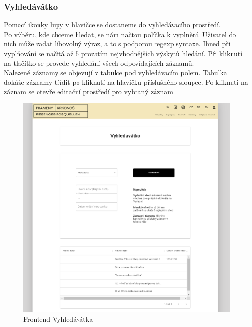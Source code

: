 \subsubsection{Vyhledávátko}
Pomocí ikonky lupy v hlavičce se dostaneme do vyhledávacího prostředí.\\
Po výběru, kde chceme hledat, se nám načtou políčka k vyplnění. Uživatel do nich může zadat
libovolný výraz, a to s podporou regexp syntaxe. Ihned při vyplňování se načítá až 5
prozatím nejvhodnějších výskytů hledání. Při kliknutí na tlačítko  se provede
vyhledání všech odpovídajících záznamů.\\
Nalezené záznamy se objevují v tabulce pod vyhledávacím polem.
Tabulka dokáže záznamy třídit po kliknutí na hlavičku příslušného sloupce.
Po kliknutí na záznam se otevře editační prostředí pro vybraný záznam.
\begin{figure}[H]
	\centering
	\includegraphics[width=.8\linewidth]{img/searchScene.png}
	\caption{Frontend Vyhledávátka}
\end{figure}

